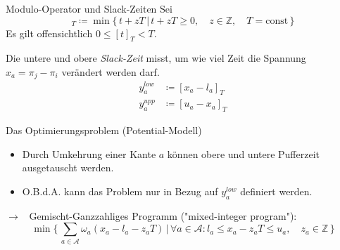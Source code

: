 \documentclass[accentcolor = tud11b, colorbacktitle, landscape, german, presentation, tudmathserif]{tudbeamer}
\newcommand{\const}{\ensuremath{\textrm{const}}}
\newcommand{\Z}{\ensuremath{\mathbb{Z}}}
\begin{document}
			\begin{frame}{Modulo-Operator und Slack-Zeiten}
				Sei
				\begin{equation*}
					[t]_T \coloneqq \min \big\{\, t + zT \,\vert\, t + zT \geq 0, \quad z \in \Z, \quad T = \const \,\big\}
				\end{equation*}
				Es gilt offensichtlich \( 0 \leq [t]_T < T \).
			
				\vspace{1cm}
				Die untere und obere \emph{Slack-Zeit} misst, um wie viel Zeit die Spannung \( x_a = \pi_j - \pi_i \) verändert werden darf.
				\begin{align*}
					y_a^\mathit{low} &\coloneqq [x_a - l_a]_T \\
					y_a^\mathit{upp} &\coloneqq [u_a - x_a]_T
				\end{align*}
			\end{frame}
		
			\begin{frame}{Das Optimierungsproblem (Potential-Modell)}
				\begin{itemize}
					\item Durch Umkehrung einer Kante \(a\) können obere und untere Pufferzeit ausgetauscht werden.
					\item O.B.d.A. kann das Problem nur in Bezug auf \( y_a^\mathit{low} \) definiert werden.
				\end{itemize}
				
				\vspace{0.5cm}
				\( \to \) \, Gemischt-Ganzzahliges Programm ("mixed-integer program"):
				\begin{equation*}
					\min \Bigg\{\, \sum_{a \in \mathcal{A}} \omega_a (x_a - l_a - z_a T) \,\bigg\vert\, \forall a \in \mathcal{A} : l_a \leq x_a - z_a T \leq u_a, \quad z_a \in \Z \,\Bigg\}
				\end{equation*}
			\end{frame}
		
\end{document}
